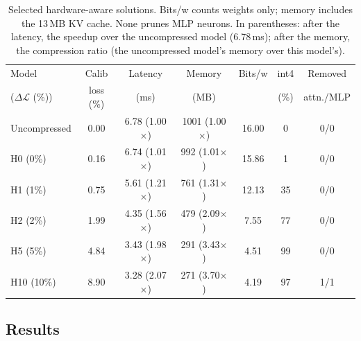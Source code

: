 \documentclass[11pt]{article}
\newcommand{\dloss}{\Delta\mathcal{L}}
\begin{document}
\begin{table}[!ht]
\centering
\footnotesize
\setlength{\tabcolsep}{3.5pt}
\begin{tabular}{lcccccc}
\toprule
Model & Calib & Latency & Memory & Bits/w & int4 & Removed \\
($\dloss$ (\%)) & loss (\%) & (ms) & (MB) & & (\%) & attn./MLP \\
\midrule
Uncompressed & 0.00 & 6.78 (1.00$\times$) & 1001 (1.00$\times$) & 16.00 & 0  & 0/0 \\
\addlinespace
H0  (0\%)  & 0.16 & 6.74 (1.01$\times$) & 992 (1.01$\times$) & 15.86 & 1  & 0/0 \\
H1  (1\%)  & 0.75 & 5.61 (1.21$\times$) & 761 (1.31$\times$) & 12.13 & 35 & 0/0 \\
H2  (2\%)  & 1.99 & 4.35 (1.56$\times$) & 479 (2.09$\times$) & 7.55  & 77 & 0/0 \\
H5  (5\%)  & 4.84 & 3.43 (1.98$\times$) & 291 (3.43$\times$) & 4.51  & 99 & 0/0 \\
H10 (10\%) & 8.90 & 3.28 (2.07$\times$) & 271 (3.70$\times$) & 4.19  & 97 & 1/1 \\
\bottomrule
\end{tabular}
\caption{Selected hardware-aware solutions. Bits/w counts weights only; memory includes the 13\,MB KV
cache. None prunes MLP neurons. In parentheses: after the latency, the speedup over the uncompressed model
(6.78\,ms); after the memory, the compression ratio (the uncompressed model's memory over this model's).}
\label{tab:hwmodels}
\end{table}

\clearpage
\subsection{Results}
\end{document}
